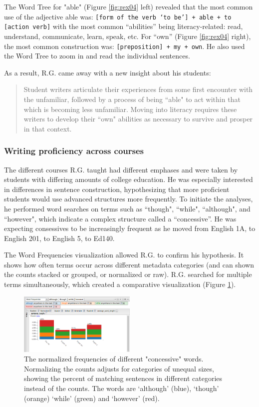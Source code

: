 \documentclass{sig-alternate}
\newcommand{\code}[1] {\texttt{#1}}
\begin{document}
The Word Tree for "able" (Figure \ref{fig:rex04} left) revealed that the most common use of the adjective able was: \code{[form of the verb `to be'] + able + to [action verb]} with the most common ``abilities'' being literacy-related: read, understand, communicate, learn, speak, etc.  For ``own'' (Figure \ref{fig:rex04} right), the most common construction was: \code{[preposition] + my + own}.  He also used the Word Tree to zoom in and read the individual sentences.

As a result, R.G. came away with a new insight about his students:
\begin{quote}
Student writers articulate their experiences from some first encounter with the unfamiliar, followed by a process of being ``able" to act within that which is becoming less unfamiliar.  Moving into literacy requires these writers to develop their ``own" abilities as necessary to survive and prosper in that context.
\end{quote} 

\subsubsection{Writing proficiency across courses}
The different courses R.G. taught had different emphases and were taken by students with differing amounts of college education. He was especially interested in differences in sentence construction, hypothesizing that more proficient students would use advanced structures more frequently. To initiate the analyses, he performed word searches on terms such as ``though", ``while", ``although", and ``however", which indicate a complex structure called a ``concessive''. He was expecting consessives to be increasingly frequent as he moved from English 1A, to English 201, to English 5, to Ed140.

The Word Frequencies visualization allowed R.G. to confirm his hypothesis. It shows how often terms occur across different metadata categories (and can shown the counts stacked or grouped, or normalized or raw). R.G. searched for multiple terms simultaneously, which created a comparative visualization (Figure \ref{fig:rex05}).

\begin{figure}[h!]
\includegraphics[width=0.5\textwidth]{fig/rex/05.png}
\caption{The normalized frequencies of different "concessive" words. Normalizing the counts adjusts for categories of unequal sizes, showing the percent of matching sentences in different categories instead of the counts. The words are `although' (blue), `though' (orange) `while' (green) and `however' (red). \label{fig:rex05}}
\end{figure}
\end{document}
